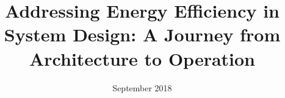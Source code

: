 \documentclass[a4paper, oneside, 11pt, hidelinks]{Thesis}  %
\begin{document}
\frontmatter      %

\title  {Addressing Energy Efficiency in System Design: A Journey from Architecture to Operation}
\addresses  {\groupname\\\deptname\\\univname}  %
\date       {September 2018}
\subject    {}
\keywords   {}

\maketitle

\pagestyle{plain}  %
\end{document}
